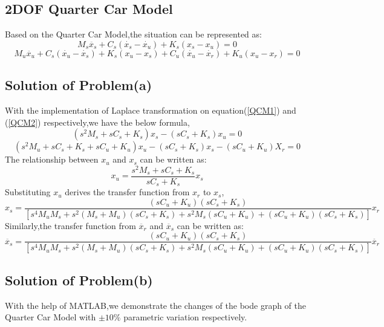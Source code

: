 \documentclass[UTF8,a4paper,11pt]{article}
\begin{document}
\subsection{2DOF Quarter Car Model}
Based on the Quarter Car Model,the situation can be represented as:
\begin{equation}\label{QCM1}
M_s\ddot{x_s} + C_s(\dot{x_s} - \dot{x_u}) + K_s(x_s - x_u) = 0
\end{equation}
\begin{equation}\label{QCM2}
M_u\ddot{x_u} + C_s(\dot{x_u} - \dot{x_s}) + K_s(x_u - x_s) + C_u(\dot{x_u} - \dot{x_r}) + K_u(x_u - x_r) = 0
\end{equation}

\subsection{Solution of Problem(a)}
With the implementation of Laplace transformation on equation(\ref{QCM1}) and (\ref{QCM2}) respectively,we have the below formula,
\begin{equation}\label{laplace1}
(s^2M_s + sC_s + K_s)x_s-(sC_s + K_s)x_u = 0
\end{equation}
\begin{equation}\label{laplace2}
(s^2M_u + sC_s + K_s + sC_u + K_u)x_u - (sC_s + K_s)x_s - (sC_u + K_u)X_r = 0
\end{equation}
The relationship between $x_u$ and $x_s$ can be written as:
$$
x_u = \frac{s^2M_s + sC_s + K_s}{sC_s + K_s}x_s
$$
Substituting $x_u$ derives the transfer function from $x_r$ to $x_s$,
$$
x_{s}=\frac{\left(s C_{u}+K_{u}\right)\left(s C_{s}+K_{s}\right)}{\left[s^{4} M_{u} M_{s}+s^{2}\left(M_{s}+M_{u}\right)\left(s C_{s}+K_{s}\right)+s^{2} M_{s}\left(s C_{u}+K_{u}\right)+\left(s C_{u}+K_{u}\right)\left(s C_{s}+K_{s}\right)\right]} x_{r}
$$
Similarly,the transfer function from $\ddot{x_r}$ and $\ddot{x_s}$ can be written as:
$$
\ddot{x_{s}}=\frac{\left(s C_{u}+K_{u}\right)\left(s C_{s}+K_{s}\right)}{\left[s^{4} M_{u} M_{s}+s^{2}\left(M_{s}+M_{u}\right)\left(s C_{s}+K_{s}\right)+s^{2} M_{s}\left(s C_{u}+K_{u}\right)+\left(s C_{u}+K_{u}\right)\left(s C_{s}+K_{s}\right)\right]} \ddot{x_{r}}
$$
\subsection{Solution of Problem(b)}
With the help of MATLAB,we demonstrate the changes of the bode graph of the Quarter Car Model with $\pm 10\%$ parametric variation respectively.
\end{document}
